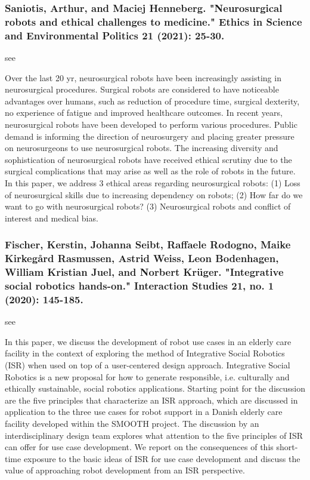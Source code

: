 \documentclass[conference]{IEEEtran}
\begin{document}
\medskip
\subsubsection{Saniotis, Arthur, and Maciej Henneberg. "Neurosurgical robots and ethical challenges to medicine." Ethics in Science and Environmental Politics 21 (2021): 25-30.
}
see \cite{saniotis2021neurosurgical}

Over the last 20 yr, neurosurgical robots have been increasingly assisting in neurosurgical procedures. Surgical robots are considered to have noticeable advantages over humans, such as reduction of procedure time, surgical dexterity, no experience of fatigue and improved healthcare outcomes. In recent years, neurosurgical robots have been developed to perform various procedures. Public demand is informing the direction of neurosurgery and placing greater pressure on neurosurgeons to use neurosurgical robots. The increasing diversity and sophistication of neurosurgical robots have received ethical scrutiny due to the surgical complications that may arise as well as the role of robots in the future. In this paper, we address 3 ethical areas regarding neurosurgical robots: (1) Loss of neurosurgical skills due to increasing dependency on robots; (2) How far do we want to go with neurosurgical robots? (3) Neurosurgical robots and conflict of interest and medical bias.

\medskip
\subsubsection{Fischer, Kerstin, Johanna Seibt, Raffaele Rodogno, Maike Kirkegård Rasmussen, Astrid Weiss, Leon Bodenhagen, William Kristian Juel, and Norbert Krüger. "Integrative social robotics hands-on." Interaction Studies 21, no. 1 (2020): 145-185.}
see \cite{fischer2020integrative}

In this paper, we discuss the development of robot use cases in an elderly care facility in the context of exploring the method of Integrative Social Robotics (ISR) when used on top of a user-centered design approach. Integrative Social Robotics is a new proposal for how to generate responsible, i.e. culturally and ethically sustainable, social robotics applications. Starting point for the discussion are the five principles that characterize an ISR approach, which are discussed in application to the three use cases for robot support in a Danish elderly care facility developed within the SMOOTH project. The discussion by an interdisciplinary design team explores what attention to the five principles of ISR can offer for use case development. We report on the consequences of this short-time exposure to the basic ideas of ISR for use case development and discuss the value of approaching robot development from an ISR perspective.
\end{document}

